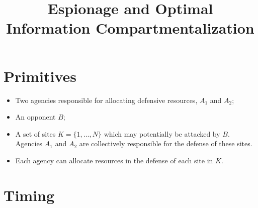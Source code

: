 \documentclass[12pt]{article}
\title{Espionage and Optimal Information Compartmentalization}
\begin{document}
\maketitle








\section*{Primitives}

\begin{itemize}

\item Two agencies responsible for allocating defensive resources, $A_1$ and $A_2$;

\item An opponent $B$;

\item A set of sites $K=\{1,\hdots,N\}$ which may potentially be attacked by $B$.  Agencies $A_1$ and $A_2$ are collectively responsible for the defense of these sites.

\item Each agency can allocate resources in the defense of each site in $K$.

\end{itemize}








\section*{Timing}
\end{document}
